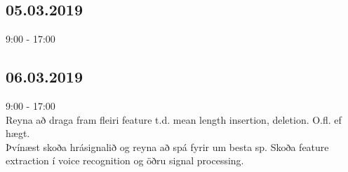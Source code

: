 \documentclass{article}
\begin{document}
\subsection*{05.03.2019}
9:00 - 17:00 \\

\subsection*{06.03.2019}
9:00 - 17:00 \\
Reyna að draga fram fleiri feature t.d. mean length insertion, deletion. O.fl. ef hægt.
\\
Þvínæst skoða hrásignalið og reyna að spá fyrir um besta sp. Skoða feature extraction í voice recognition og öðru signal processing.
\end{document}
